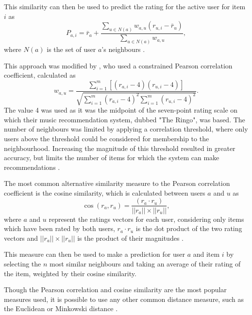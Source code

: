 This similarity can then be used to predict the rating for the active user for item $i$ as
\begin{equation}
    P_{a,i} = \bar{r}_a + \dfrac{\sum\limits_{u \in N(a)}w_{a,u}(r_{u,i}-\bar{r}_u)}{\sum\limits_{u \in N(a)}w_{a,u}},
\end{equation}
where $N(a)$ is the set of user $a$'s neighbours \parencite{herlocker2002empirical}.

This approach was modified by \cite{shardanand1995social}, who used a constrained Pearson correlation coefficient, calculated as
\begin{equation}
    w_{a,u} = \dfrac{\sum\limits_{i=1}^{m}[(r_{a,i}-4)(r_{u,i}-4)]}{\sqrt{\sum\limits_{i=1}^{m}(r_{a,i}-4)^2\sum\limits_{i=1}^{m}(r_{u,i}-4)^2}}.
\end{equation}
The value 4 was used as it was the midpoint of the seven-point rating scale on which their music recommendation system, dubbed "The Ringo", was based. The number of neighbours was limited by applying a correlation threshold, where only users above the threshold could be considered for membership to the neighbourhood. Increasing the magnitude of this threshold resulted in greater accuracy, but limits the number of items for which the system can make recommendations \parencite{herlocker2002empirical}.

The most common alternative similarity measure to the Pearson correlation coefficient is the cosine similarity, which is calculated between users $a$ and $u$ as
\begin{equation}
    \cos(r_a,r_u) = \dfrac{(r_a\cdot r_u)}{||r_a||\times||r_u||},
\end{equation}
where $a$ and $u$ represent the ratings vectors for each user, considering only items which have been rated by both users, $r_a\cdot r_u$ is the dot product of the two rating vectors and $||r_a||\times||r_u||$ is the product of their magnitudes \parencite{handbook_ch2}.

This measure can then be used to make a prediction for user $a$ and item $i$ by selecting the $n$ most similar neighbours and taking an average of their rating of the item, weighted by their cosine similarity.

Though the Pearson correlation and cosine similarity are the most popular measures used, it is possible to use any other common distance measure, such as the Euclidean or Minkowski distance \parencite{handbook_ch2}.

